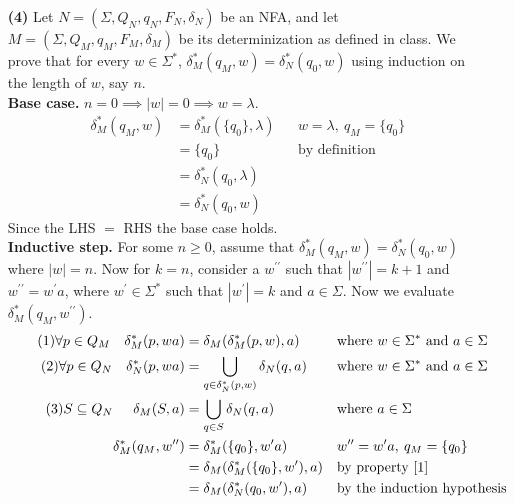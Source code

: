 \documentclass [10pt]{article}
\begin{document}
\begin{enumerate}
\begin{enumerate}
	\end{enumerate}
	\item[\textbf{(4)}]Let $N = (\Sigma,Q_{N},q_{N},F_{N},\delta_{N})$ be an NFA, and let $M = (\Sigma,Q_{M},q_{M},F_{M},\delta_{M})$ be its determinization as defined in class. We prove that for every $w\in\Sigma^{*}$, $\delta^{*}_{M}(q_{M},w)=\delta^{*}_{N}(q_{0},w)$ using induction on the length of $w$, say $n$.\\
	\textbf{Base case.} $n = 0 \implies \left|w\right| = 0 \implies w = \lambda$.
	\begin{align}
		\delta^{*}_{M}(q_{M},w) &= \delta^{*}_{M}(\{q_{0}\},\lambda) && \text{$w = \lambda,\: q_{M} = \{q_{0}\}$} \nonumber \\
		&= \{q_{0}\} && \text{by definition} \nonumber \\
		&= \delta^{*}_N(q_{0},\lambda) \nonumber \\
		&= \delta^{*}_N(q_{0},w) \nonumber
	\end{align}
	Since the LHS $=$ RHS the base case holds.\\
	\textbf{Inductive step.} For some $n \ge 0$, assume that $\delta^{*}_{M}(q_{M},w)=\delta^{*}_{N}(q_{0},w)$ where $\left|w\right| = n$. Now for $k = n$, consider a $w^{\prime\prime}$ such that $\left|w^{\prime\prime}\right| = k + 1$ and $w^{\prime\prime} = w^{\prime}a$, where $w^{\prime} \in \Sigma^{*}$ such that $\left|w^{\prime}\right| = k$ and $a \in \Sigma$. Now we evaluate $\delta^{*}_{M}(q_{M},w^{\prime\prime})$.
	\begin{align}
		\label{1} \tag{1} \forall p \in Q_{M}\quad\delta^{*}_{M}(p,wa) &= \delta_{M}(\delta^{*}_{M}(p,w),a) && \text{where $w \in \Sigma^{*}$ and $a \in \Sigma$}\\
		\label{2} \tag{2} \forall p \in Q_{N}\quad\delta^{*}_{N}(p,wa) &= \bigcup\limits_{q \in \delta^{*}_{N}(p,w)} \delta_{N}(q,a) && \text{where $w \in \Sigma^{*}$ and $a \in \Sigma$}\\
		\label{3} \tag{3} S \subseteq Q_{N}\quad\:\:\delta_{M}(S,a) &= \bigcup\limits_{q \in S} \delta_{N}(q,a) && \text{where $a \in \Sigma$}\\
		\delta^{*}_{M}(q_{M},w^{\prime\prime}) &= \delta^{*}_{M}(\{q_0\},w^{\prime}a) && \text{$w^{\prime\prime} = w^{\prime}a,\:q_{M}=\{q_{0}\}$} \nonumber \\
		&= \delta_{M}(\delta^{*}_{M}(\{q_{0}\},w^{\prime}),a) && \text{by property \ref{1}} \nonumber \\
		&= \delta_{M}(\delta^{*}_{N}(q_{0},w^{\prime}),a) && \text{by the induction hypothesis} \nonumber \\

\end{align}
\end{enumerate}
\end{document}
